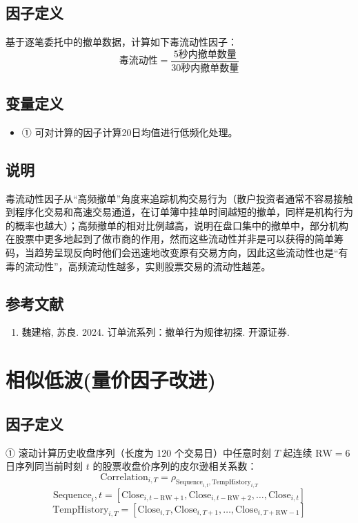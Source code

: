 \documentclass{article}
\begin{document}
\subsection{因子定义}

基于逐笔委托中的撤单数据，计算如下毒流动性因子：
\begin{equation}
    \text{毒流动性} = \frac{5\text{秒内撤单数量}}{30\text{秒内撤单数量}}
\end{equation}

\subsection{变量定义}
\begin{itemize}
    \item ① 可对计算的因子计算20日均值进行低频化处理。
\end{itemize}

\subsection{说明}
毒流动性因子从“高频撤单”角度来追踪机构交易行为（散户投资者通常不容易接触到程序化交易和高速交易通道，在订单簿中挂单时间越短的撤单，同样是机构行为的概率也越大）；高频撤单的相对比例越高，说明在盘口集中的撤单中，部分机构在股票中更多地起到了做市商的作用，然而这些流动性并非是可以获得的简单筹码，当趋势呈现反向时他们会迅速地改变原有交易方向，因此这些流动性也是“有毒的流动性”，高频流动性越多，实则股票交易的流动性越差。

\subsection{参考文献}
\begin{enumerate}
    \item 魏建榕, 苏良. 2024. 订单流系列：撤单行为规律初探. 开源证券.
\end{enumerate}

\section{相似低波(量价因子改进)}

\subsection{因子定义}
① 滚动计算历史收盘序列（长度为 120 个交易日）中任意时刻 \( T \) 起连续 \( \mathrm{RW}=6 \) 日序列同当前时刻 \( t \) 的股票收盘价序列的皮尔逊相关系数：
\begin{equation}
    \mathrm{Correlation}_{i,T} = \rho_{\mathrm{Sequence}_{i,t}, \mathrm{TempHistory}_{i,T}}
\end{equation}
\begin{equation}
    \mathrm{Sequence}_{i},t = [\mathrm{Close}_{i,t-\mathrm{RW}+1}, \mathrm{Close}_{i,t-\mathrm{RW}+2}, \dots, \mathrm{Close}_{i,t}]
\end{equation}
\begin{equation}
    \mathrm{TempHistory}_{i,T} = [\mathrm{Close}_{i,T}, \mathrm{Close}_{i,T+1}, \dots, \mathrm{Close}_{i,T+\mathrm{RW}-1}]
\end{equation}
\end{document}
